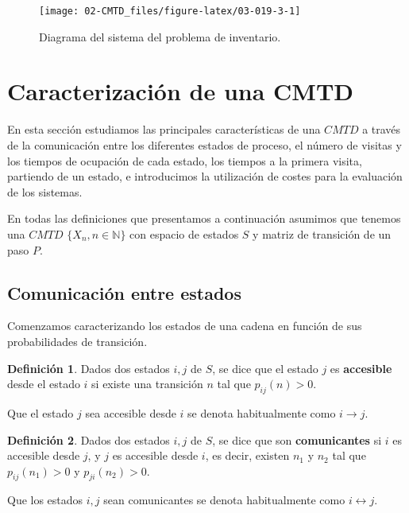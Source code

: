\documentclass[
]{book}
\newenvironment{yellowbox}{
  \definecolor{shadecolor}{rgb}{210, 180, 140}  
  \color{black}
  \begin{shaded}}
 {\end{shaded}}
\theoremstyle{definition}
\newtheorem{definition}{Definición}[chapter]
\theoremstyle{definition}
\theoremstyle{definition}
\theoremstyle{definition}
\theoremstyle{remark}
\begin{document}
\begin{figure}

{\centering \texttt{[image: 02-CMTD\_files/figure-latex/03-019-3-1]} 

}

\caption{Diagrama del sistema del problema de inventario.}\label{fig:03-019-3}
\end{figure}

\hypertarget{CaracCMTD}{%
\section{Caracterización de una CMTD}\label{CaracCMTD}}

En esta sección estudiamos las principales características de una \(CMTD\) a través de la comunicación entre los diferentes estados de proceso, el número de visitas y los tiempos de ocupación de cada estado, los tiempos a la primera visita, partiendo de un estado, e introducimos la utilización de costes para la evaluación de los sistemas.

En todas las definiciones que presentamos a continuación asumimos que tenemos una \(CMTD\) \(\{X_n, n \in \mathbb{N}\}\) con espacio de estados \(S\) y matriz de transición de un paso \(P\).

\hypertarget{comunicaciuxf3n-entre-estados}{%
\subsection{Comunicación entre estados}\label{comunicaciuxf3n-entre-estados}}

Comenzamos caracterizando los estados de una cadena en función de sus probabilidades de transición.

\begin{yellowbox}

\begin{definition}
Dados dos estados \(i, j\) de \(S\), se dice que el estado \(j\) es \textbf{accesible} desde el estado \(i\) si existe una transición \(n\) tal que \(p_{ij}(n) > 0\).

Que el estado \(j\) sea accesible desde \(i\) se denota habitualmente como \(i \rightarrow j\).
\end{definition}

\end{yellowbox}

\begin{yellowbox}

\begin{definition}
Dados dos estados \(i, j\) de \(S\), se dice que son \textbf{comunicantes} si \(i\) es accesible desde \(j\), y \(j\) es accesible desde \(i\), es decir, existen \(n_1\) y \(n_2\) tal que \(p_{ij}(n_1) > 0\) y \(p_{ji}(n_2) > 0.\)

Que los estados \(i, j\) sean comunicantes se denota habitualmente como \(i \leftrightarrow j\).
\end{definition}

\end{yellowbox}
\end{document}
